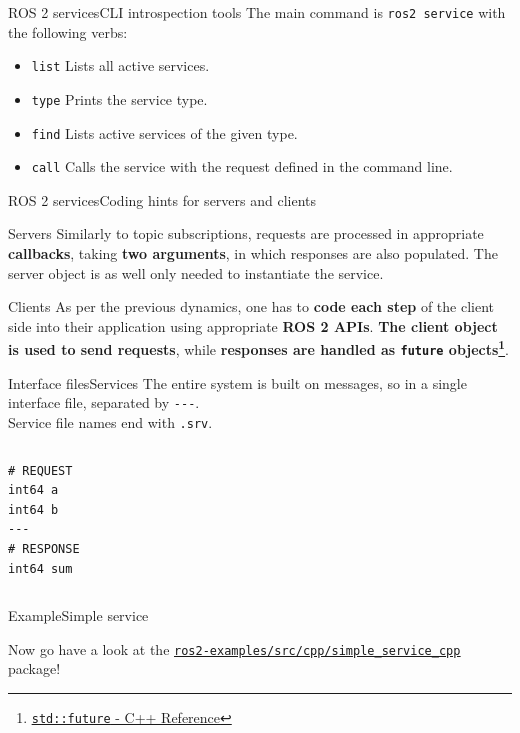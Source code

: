 \begin{frame}{ROS 2 services}{CLI introspection tools}
  The main command is \texttt{ros2 service} with the following verbs:
  \begin{itemize}
    \item \texttt{list} Lists all active services.
    \item \texttt{type} Prints the service type.
    \item \texttt{find} Lists active services of the given type.
    \item \texttt{call} Calls the service with the request defined in the command line.
  \end{itemize}
\end{frame}
\begin{frame}{ROS 2 services}{Coding hints for servers and clients}
  \begin{block}{Servers}
    Similarly to topic subscriptions, requests are processed in appropriate \textbf{callbacks}, taking \textbf{two arguments}, in which responses are also populated. The server object is as well only needed to instantiate the service.
  \end{block}
  \begin{block}{Clients}
    As per the previous dynamics, one has to \textbf{code each step} of the client side into their application using appropriate \textbf{ROS 2 APIs}. \textbf{The client object is used to send requests}, while \textbf{responses are handled as \texttt{future} objects\footnote{\href{https://en.cppreference.com/w/cpp/thread/future}{\color{blue}\underline{\texttt{std::future} - C++ Reference}}}}.
  \end{block}
\end{frame}

\begin{frame}[fragile]{Interface files}{Services}
  The entire system is built on messages, so  in a single interface file, separated by \texttt{-{}-{}-}.\\
  Service file names end with \texttt{.srv}.
  \begin{columns}
  \begin{lstlisting}[language=ros2msg, caption=Definition of the \texttt{example\_interfaces/srv/AddTwoInts} service.]
# REQUEST
int64 a
int64 b
---
# RESPONSE
int64 sum\end{lstlisting}
  \end{columns}
\end{frame}

\begin{frame}{Example}{Simple service}
  \begin{block}{}
    \centering
    Now go have a look at the \href{https://github.com/IntelligentSystemsLabUTV/ros2-examples/tree/humble/src/cpp/simple_service_cpp}{\color{blue}\underline{\texttt{ros2-examples/src/cpp/simple\_service\_cpp}}} package!
  \end{block}
\end{frame}
